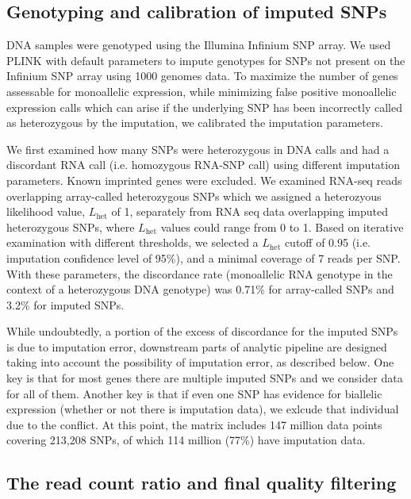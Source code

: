 \documentclass[letterpaper]{article}
\begin{document}
\subsection{Genotyping and calibration of imputed SNPs}

DNA samples were genotyped using the Illumina Infinium SNP array. We used
PLINK with default parameters to impute genotypes for SNPs not present on the
Infinium SNP array using 1000 genomes data. To maximize the number of genes
assessable for monoallelic expression, while minimizing false positive
monoallelic expression calls which can arise if the underlying SNP has been
incorrectly called as heterozygous by the imputation, we calibrated the
imputation parameters.

We first examined how many SNPs were heterozygous in DNA calls and had a
discordant RNA call (i.e. homozygous RNA-SNP call) using different imputation
parameters. Known imprinted genes were excluded. We examined RNA-seq reads
overlapping array-called heterozygous SNPs which we assigned a heterozyous
likelihood value, \(L_\mathrm{het}\) of 1, separately from RNA seq data
overlapping imputed heterozygous SNPs, where \(L_\mathrm{het}\) values could
range from 0 to 1. Based on iterative examination with different thresholds,
we selected a \(L_\mathrm{het}\) cutoff of 0.95 (i.e. imputation confidence
level of 95\%), and a minimal coverage of 7 reads per SNP. With these
parameters, the discordance rate (monoallelic RNA genotype in the context of a
heterozygous DNA genotype) was 0.71\% for array-called SNPs and 3.2\% for
imputed SNPs.

While undoubtedly, a portion of the excess of discordance for the imputed SNPs
is due to imputation error, downstream parts of analytic pipeline are designed
taking into account the possibility of imputation error, as described below.
One key is that for most genes there are multiple imputed SNPs and we consider
data for all of them. Another key is that if even one SNP has evidence for
biallelic expression (whether or not there is imputation data), we exlcude
that individual due to the conflict. At this point, the matrix includes 147
million data points covering 213,208 SNPs, of which 114 million (77\%) have
imputation data.

\subsection{The read count ratio and final quality filtering}

\label{sec:filtering}
\end{document}
